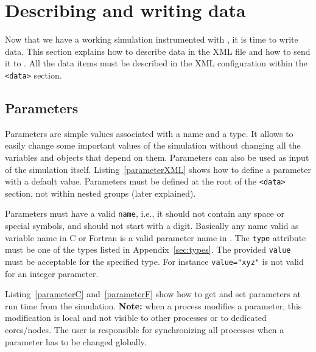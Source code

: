 \section{Describing and writing data}

Now that we have a working simulation instrumented with \Damaris, it is time to write data.
This section explains how to describe data in the XML file and how to send it to \Damaris.
All the data items must be described in the XML configuration within the \texttt{<data>} section.

\subsection{Parameters}

Parameters are simple values associated with a name and a type. It allows to
easily change some important values of the simulation without changing all the variables
and objects that depend on them. Parameters can also be used as input of the simulation itself. 
Listing~\ref{parameterXML} shows how to define a parameter with a default value.
Parameters must be defined at the root of the \texttt{<data>}  section, not within nested groups
(later explained).

\noindent\begin{minipage}{\textwidth}
\vspace{0.5cm}

\end{minipage}

Parameters must have a valid \texttt{name}, i.e., it should not contain any space or special symbols,
and should not start with a digit. Basically any name valid as variable name in C or Fortran is a valid
parameter name in \Damaris. The \texttt{type} attribute must be one of the types listed in 
Appendix~\ref{sec:types}. The provided \texttt{value} must be acceptable for the specified type. For instance
\texttt{value="xyz"} is not valid for an integer parameter.

Listing~\ref{parameterC} and~\ref{parameterF} show how to get and set parameters at run time
from the simulation. \textbf{Note:} when a process modifies a parameter, this modification is local and
not visible to other processes or to dedicated cores/nodes. The user is responsible for synchronizing all
processes when a parameter has to be changed globally.

